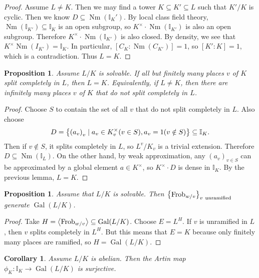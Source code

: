 \documentclass[leqno, openany]{memoir}
\newtheorem{cor}[thm]{Corollary}
\newtheorem{prop}[thm]{Proposition}
\theoremstyle{definition}
\theoremstyle{remark}
\theoremstyle{plain}
\theoremstyle{definition}
\theoremstyle{remark}
\newcommand{\I}{\mathbb{I}}
\DeclareMathOperator{\Gal}{Gal}
\DeclareMathOperator{\Nm}{Nm}
\DeclareMathOperator{\Frob}{Frob}
\begin{document}
\begin{proof} Assume $L \neq K$. Then we may find a tower $K \subseteq K'
    \subseteq L$ such that $K'/K$ is cyclic. Then we know $D \subseteq
    \Nm(\I_K')$. By local class field theory, $\Nm(\I_{K'}) \subseteq \I_K$ is
    an open subgroup, so $K^{\times} \cdot \Nm(\I_{K'})$ is also an open
    subgroup. Therefore $K^{\times} \cdot \Nm(\I_{K'})$ is also closed. By
    density, we see that $K^{\times} \Nm(I_{K'}) = \I_K$. In particular, $[C_K
    : \Nm(C_{K'})] = 1$, so $[K':K] = 1$, which is a contradiction. Thus $L =
    K$.  \end{proof}

\begin{prop} Assume $L/K$ is solvable. If all but finitely many places $v$ of
$K$ split completely in $L$, then $L = K$. Equivalently, if $L \neq K$, then
there are infinitely many places $v$ of $K$ that do not split completely in
$L$.  \end{prop}

\begin{proof} Choose $S$ to contain the set of all $v$ that do not split
    completely in $L$. Also choose \[ D = \qty{{(a_v)}_v \mid a_v \in
    K_v^{\times} (v \in S), a_v = 1 (v \notin S)} \subseteq \I_K. \] Then if $v
    \notin S$, it splits completely in $L$, so $L^v / K_v$ is a trivial
    extension. Therefore $D \subseteq \Nm(\I_L)$. On the other hand, by weak
    approximation, any ${(a_v)}_{v \in S}$ can be approximated by a global
    element $a \in K^{\times}$, so $K^{\times} \cdot D$ is dense in $\I_K$. By
    the previous lemma, $L = K$.  \end{proof}

\begin{prop} Assume that $L/K$ is solvable. Then $\qty{\Frob_{w/v}}_{v\
\text{unramified}}$ generate $\Gal(L/K)$.  \end{prop}

\begin{proof} Take $H = \ev{\Frob_{w/v}} \subseteq \Gal(L/K)$. Choose $E =
    L^H$. If $v$ is unramified in $L$, then $v$ splits completely in $L^H$. But
    this means that $E = K$ because only finitely many places are ramified, so
    $H = \Gal(L/K)$.  \end{proof}

\begin{cor} Assume $L/K$ is abelian. Then the Artin map $\phi_K \colon \I_K \to
\Gal(L/K)$ is surjective.  \end{cor}
\end{document}

